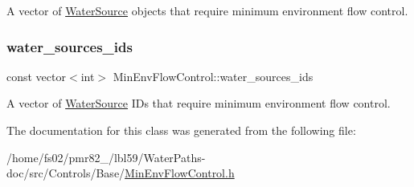 A vector of \mbox{\hyperlink{classWaterSource}{Water\+Source}} objects that require minimum environment flow control. 

\mbox{\label{classMinEnvFlowControl_a775d6408e5c581754ee4240eea68abdc}} 
\subsubsection{\texorpdfstring{water\+\_\+sources\+\_\+ids}{water\_sources\_ids}}
{\footnotesize\ttfamily const vector$<$int$>$ Min\+Env\+Flow\+Control\+::water\+\_\+sources\+\_\+ids}



A vector of \mbox{\hyperlink{classWaterSource}{Water\+Source}} I\+Ds that require minimum environment flow control. 



The documentation for this class was generated from the following file\+:\begin{DoxyCompactItemize}
\item 
/home/fs02/pmr82\+\_/lbl59/\+Water\+Paths-\/doc/src/\+Controls/\+Base/\mbox{\hyperlink{MinEnvFlowControl_8h}{Min\+Env\+Flow\+Control.\+h}}\end{DoxyCompactItemize}
